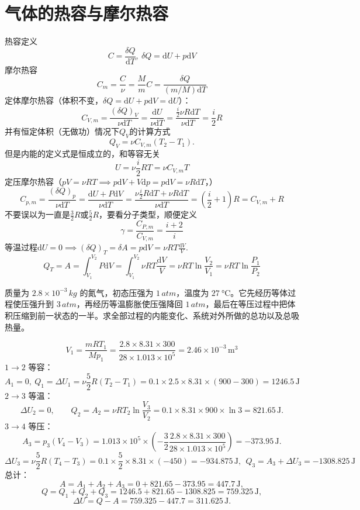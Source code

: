 
\section{气体的热容与摩尔热容}

\begin{definition}[热容]
    热容定义\[C=\frac{\delta Q}{\mathrm dT},~\delta Q=\mathrm dU+p\mathrm dV\]
    摩尔热容\[C_m=\frac{C}{\nu}=\frac{M}{m}C=\frac{\delta Q}{(m/M)\mathrm dT}\]
    定体摩尔热容（体积不变，$\delta Q=\mathrm dU+p\mathrm dV=\mathrm dU$）：\[C_{V,m}=\frac{(\delta Q)_V}{\nu\mathrm dT}=\frac{\mathrm dU}{\nu\mathrm dT}=\frac{\frac{i}{2}\nu R\mathrm dT}{\nu\mathrm dT}=\frac{i}{2}R\]
    并有恒定体积（无做功）情况下$Q_V$的计算方式\[Q_V=\nu C_{V,m}(T_2-T_1).\]但是内能的定义式是恒成立的，和等容无关\[U=\nu\frac{i}{2}RT=\nu C_{V,m}T\]
    定压摩尔热容（$pV=\nu RT\implies p\mathrm dV+V\mathrm dp=p\mathrm dV=\nu R\mathrm dT$，）
    \[C_{p,m}=\frac{(\delta Q)_p}{\nu\mathrm dT}=\frac{\mathrm dU+P\mathrm dV}{\nu\mathrm dT}=\frac{\nu\frac{i}{2}R\mathrm dT+\nu R\mathrm dT}{\nu\mathrm dT}=\left(\frac{i}{2}+1\right)R=C_{V,m}+R\]
    不要误以为一直是$\frac{3}{2}R$或$\frac{5}{2}R$，要看分子类型，顺便定义\[\gamma=\frac{C_{P,m}}{C_{V,m}}=\frac{i+2}{i}\]
    等温过程\(\mathrm dU=0\implies(\delta Q)_T=\delta A=p\mathrm dV=\nu RT\frac{\mathrm{d}V}{V}.\)
    \[Q_T=A=\int_{V_1}^{V_2}P\mathrm dV=\int_{V_1}^{V_2}\nu RT\frac{\mathrm{d}V}{V}=\nu RT\ln\frac{V_2}{V_1}=\nu RT\ln\frac{P_1}{P_2}\]
\end{definition} 

\begin{exercise}
质量为 \(2.8\times10^{-3}\,\si{kg}\) 的氮气，初态压强为 \(1\,\si{atm}\)，温度为 \(\SI{27}{\celsius}\)。它先经历等体过程使压强升到 \(3\,\si{atm}\)，再经历等温膨胀使压强降回 \(1\,\si{atm}\)，最后在等压过程中把体积压缩到前一状态的一半。求全部过程的内能变化、系统对外所做的总功以及总吸热量。
\end{exercise}
\begin{solution}
\[V_1=\frac{mRT_1}{Mp_1}=\frac{2.8\times 8.31\times 300}{28\times 1.013\times 10^5}=2.46\times10^{-3}\,\text{m}^3\]
\(1\to2\) 等容：
\[
A_1=0,~ Q_1=\Delta U_1=\nu\frac{5}{2}R(T_2-T_1)=0.1\times 2.5\times 8.31\times (900-300)=1246.5\,\text{J}
\]
\(2\to3\) 等温：
\[
\Delta U_2=0,\qquad Q_2=A_2=\nu RT_2\ln\frac{V_3}{V_2}=0.1\times 8.31\times 900\times \ln3=821.65\,\text{J}.
\]
\(3\to4\) 等压：
\[A_3=p_3(V_4-V_3)=1.013\times 10^5\times \left(-\frac32\frac{2.8\times 8.31\times 300}{28\times 1.013\times 10^5}\right)=-373.95\,\text{J}.\]
\[\Delta U_3=\nu\frac{5}{2}R(T_4-T_3)=0.1\times\frac52\times 8.31\times(-450)=-934.875\,\text{J},~~Q_3=A_3+\Delta U_3=-1308.825\,\text{J}\]
总计：
\[
A=A_1+A_2+A_3=0+821.65-373.95=447.7\,\text{J},
\]\[
Q=Q_1+Q_2+Q_3=1246.5+821.65-1308.825=759.325\,\text{J},
\]\[
\Delta U=Q-A=759.325-447.7=311.625\,\text{J}.
\]
\end{solution}

